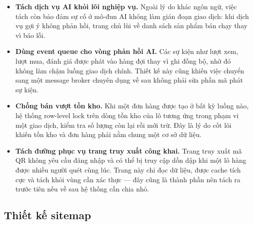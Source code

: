 \begin{itemize}
    \item \textbf{Tách dịch vụ AI khỏi lõi nghiệp vụ.} Ngoài lý do khác ngôn ngữ, việc tách còn bảo đảm sự cố ở mô-đun AI không làm gián đoạn giao dịch: khi dịch vụ gợi ý không phản hồi, trang chủ lùi về danh sách sản phẩm bán chạy thay vì báo lỗi.
    \item \textbf{Dùng event queue cho vòng phản hồi AI.} Các sự kiện như lượt xem, lượt mua, đánh giá được phát vào hàng đợi thay vì ghi đồng bộ, nhờ đó không làm chậm luồng giao dịch chính. Thiết kế này cũng khiến việc chuyển sang một message broker chuyên dụng về sau không phải sửa phần mã phát sự kiện.
    \item \textbf{Chống bán vượt tồn kho.} Khi một đơn hàng được tạo ở bất kỳ luồng nào, hệ thống row-level lock trên dòng tồn kho của lô tương ứng trong phạm vi một giao dịch, kiểm tra số lượng còn lại rồi mới trừ. Đây là lý do cốt lõi khiến tồn kho và đơn hàng phải nằm chung một cơ sở dữ liệu.
    \item \textbf{Tách đường phục vụ trang truy xuất công khai.} Trang truy xuất mã QR không yêu cầu đăng nhập và có thể bị truy cập dồn dập khi một lô hàng được nhiều người quét cùng lúc. Trang này chỉ đọc dữ liệu, được cache tích cực và tách khỏi vùng cần xác thực --- đây cũng là thành phần nên tách ra trước tiên nếu về sau hệ thống cần chia nhỏ.
\end{itemize}


\subsection{Thiết kế sitemap}
\label{sec:sitemap}

